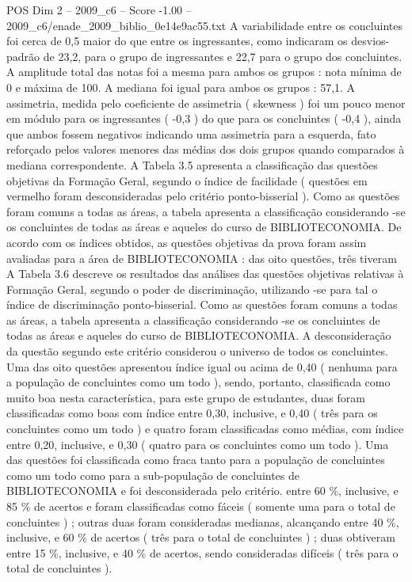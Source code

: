 \begin{textsample}{POS Dim 2 – 2009\_c6 – Score -1.00 – 2009\_c6/enade\_2009\_biblio\_0e14e9ac55.txt}
A variabilidade entre os concluintes foi cerca de 0,5 maior do que entre os ingressantes, como indicaram os desvios-padrão de 23,2, para o grupo de ingressantes e 22,7 para o grupo dos concluintes.
A amplitude total das notas foi a mesma para ambos os grupos : nota mínima de 0 e máxima de 100.
A mediana foi igual para ambos os grupos : 57,1.
A assimetria, medida pelo coeficiente de assimetria ( skewness ) foi um pouco menor em módulo para os ingressantes ( -0,3 ) do que para os concluintes ( -0,4 ), ainda que ambos fossem negativos indicando uma assimetria para a esquerda, fato reforçado pelos valores menores das médias dos dois grupos quando comparados à mediana correspondente.
A Tabela 3.5 apresenta a classificação das questões objetivas da Formação Geral, segundo o índice de facilidade ( questões em vermelho foram desconsideradas pelo critério ponto-bisserial ).
Como as questões foram comuns a todas as áreas, a tabela apresenta a classificação considerando -se os concluintes de todas as áreas e aqueles do curso de BIBLIOTECONOMIA.
De acordo com os índices obtidos, as questões objetivas da prova foram assim avaliadas para a área de BIBLIOTECONOMIA : das oito questões, três tiveram A Tabela 3.6 descreve os resultados das análises das questões objetivas relativas à Formação Geral, segundo o poder de discriminação, utilizando -se para tal o índice de discriminação ponto-bisserial.
Como as questões foram comuns a todas as áreas, a tabela apresenta a classificação considerando -se os concluintes de todas as áreas e aqueles do curso de BIBLIOTECONOMIA.
A desconsideração da questão segundo este critério considerou o universo de todos os concluintes.
Uma das oito questões apresentou índice igual ou acima de 0,40 ( nenhuma para a população de concluintes como um todo ), sendo, portanto, classificada como muito boa nesta característica, para este grupo de estudantes, duas foram classificadas como boas com índice entre 0,30, inclusive, e 0,40 ( três para os concluintes como um todo ) e quatro foram classificadas como médias, com índice entre 0,20, inclusive, e 0,30 ( quatro para os concluintes como um todo ).
Uma das questões foi classificada como fraca tanto para a população de concluintes como um todo como para a sub-população de concluintes de BIBLIOTECONOMIA e foi desconsiderada pelo critério. entre 60 \%, inclusive, e 85 \% de acertos e foram classificadas como fáceis ( somente uma para o total de concluintes ) ; outras duas foram consideradas medianas, alcançando entre 40 \%, inclusive, e 60 \% de acertos ( três para o total de concluintes ) ; duas obtiveram entre 15 \%, inclusive, e 40 \% de acertos, sendo consideradas difíceis ( três para o total de concluintes ).

\end{textsample}
